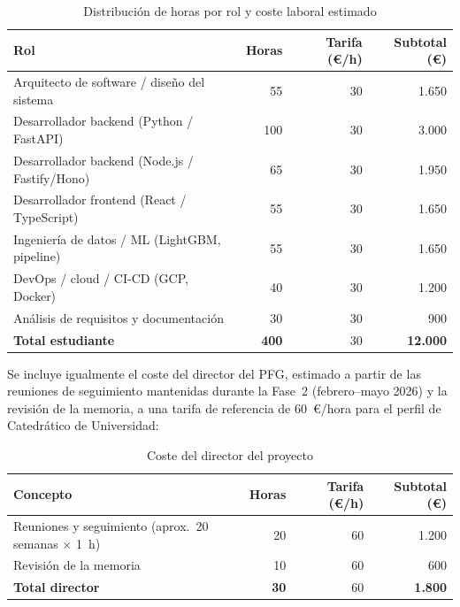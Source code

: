 \begin{table}[H]
  \centering
  \caption{Distribución de horas por rol y coste laboral estimado}
  \label{tab:costes_laborales}
  \small
  \begin{tabular}{lrrr}
    \toprule
    \textbf{Rol}                                   & \textbf{Horas} & \textbf{Tarifa (€/h)} & \textbf{Subtotal (€)} \\
    \midrule
    Arquitecto de software / diseño del sistema    & 55             & 30                    & 1.650                 \\
    Desarrollador backend (Python / FastAPI)       & 100            & 30                    & 3.000                 \\
    Desarrollador backend (Node.js / Fastify/Hono) & 65             & 30                    & 1.950                 \\
    Desarrollador frontend (React / TypeScript)    & 55             & 30                    & 1.650                 \\
    Ingeniería de datos / ML (LightGBM, pipeline)  & 55             & 30                    & 1.650                 \\
    DevOps / cloud / CI-CD (GCP, Docker)           & 40             & 30                    & 1.200                 \\
    Análisis de requisitos y documentación         & 30             & 30                    & 900                   \\
    \midrule
    \textbf{Total estudiante}                      & \textbf{400}   & 30                    & \textbf{12.000}       \\
    \bottomrule
  \end{tabular}
\end{table}

Se incluye igualmente el coste del director del PFG, estimado a partir de las reuniones de
seguimiento mantenidas durante la Fase~2 (febrero--mayo 2026) y la revisión de la memoria, a
una tarifa de referencia de 60~€/hora para el perfil de Catedrático de Universidad:

\begin{table}[H]
  \centering
  \caption{Coste del director del proyecto}
  \label{tab:coste_director}
  \small
  \begin{tabular}{lrrr}
    \toprule
    \textbf{Concepto}                                         & \textbf{Horas} & \textbf{Tarifa (€/h)} & \textbf{Subtotal (€)} \\
    \midrule
    Reuniones y seguimiento (aprox.\ 20 semanas $\times$ 1~h) & 20             & 60                    & 1.200                 \\
    Revisión de la memoria                                    & 10             & 60                    & 600                   \\
    \midrule
    \textbf{Total director}                                   & \textbf{30}    & 60                    & \textbf{1.800}        \\
    \bottomrule
  \end{tabular}
\end{table}

